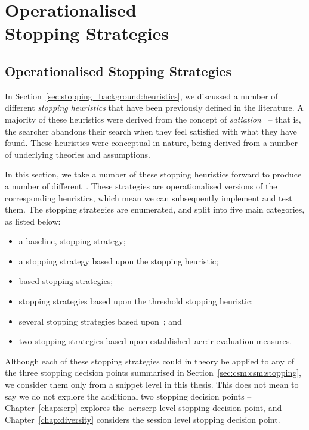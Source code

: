 
\chapter[Operationalised Stopping Strategies]{Operationalised\\Stopping Strategies}\label{chap:strategies}



\section{Operationalised Stopping Strategies}\label{sec:csm:stopping}
In Section~\ref{sec:stopping_background:heuristics}, we discussed a number of different \emph{stopping heuristics} that have been previously defined in the literature. A majority of these heuristics were derived from the concept of \emph{satiation}~\citep{simon1955satiation} -- that is, the searcher abandons their search when they feel satisfied with what they have found. These heuristics were conceptual in nature, being derived from a number of underlying theories and assumptions.

In this section, we take a number of these stopping heuristics forward to produce a number of different~. These strategies are operationalised versions of the corresponding heuristics, which mean we can subsequently implement and test them. The stopping strategies are enumerated, and split into five main categories, as listed below:

\begin{itemize}
    \item{a baseline,  stopping strategy;}
    \item{a stopping strategy based upon the  stopping heuristic;}
    \item{ based stopping strategies;}
    \item{stopping strategies based upon the  threshold stopping heuristic;}
    \item{several stopping strategies based upon~; and}
    \item{two stopping strategies based upon established~\gls{acr:ir} evaluation measures.}
\end{itemize}

Although each of these stopping strategies could in theory be applied to any of the three stopping decision points summarised in Section~\ref{sec:csm:csm:stopping}, we consider them only from a snippet level in this thesis. This does not mean to say we do not explore the additional two stopping decision points -- Chapter~\ref{chap:serp} explores the~\gls{acr:serp} level stopping decision point, and Chapter~\ref{chap:diversity} considers the session level stopping decision point.


